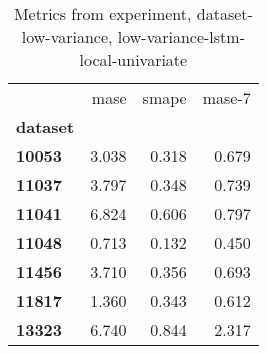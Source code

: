 \begin{table}[h]
\centering
\caption{Metrics from experiment, dataset-low-variance, low-variance-lstm-local-univariate}
\label{table:low-variance-lstm-local-univariate-dataset-low-variance}
\begin{tabular}{lrrr}
\toprule
{} &   mase &  smape &  mase-7 \\
\textbf{dataset} &        &        &         \\
\midrule
\textbf{10053  } &  3.038 &  0.318 &   0.679 \\
\textbf{11037  } &  3.797 &  0.348 &   0.739 \\
\textbf{11041  } &  6.824 &  0.606 &   0.797 \\
\textbf{11048  } &  0.713 &  0.132 &   0.450 \\
\textbf{11456  } &  3.710 &  0.356 &   0.693 \\
\textbf{11817  } &  1.360 &  0.343 &   0.612 \\
\textbf{13323  } &  6.740 &  0.844 &   2.317 \\
\bottomrule
\end{tabular}
\end{table}

